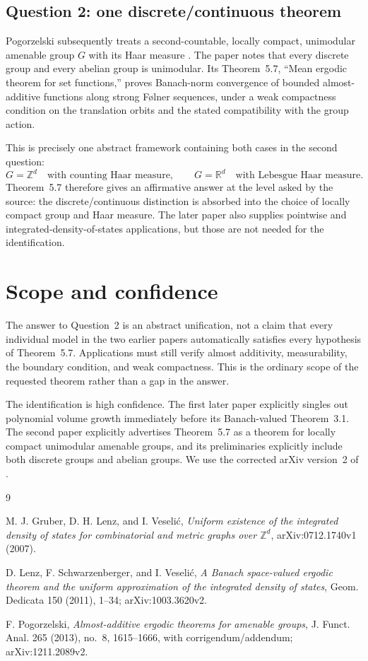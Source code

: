 \documentclass[11pt]{article}
\begin{document}
\subsection*{Question 2: one discrete/continuous theorem}

Pogorzelski subsequently treats a second-countable, locally compact,
unimodular amenable group $G$ with its Haar measure \cite{Pog}.  The paper
notes that every discrete group and every abelian group is unimodular.
Its Theorem~5.7, ``Mean ergodic theorem for set functions,'' proves
Banach-norm convergence of bounded almost-additive functions along strong
F\o lner sequences, under a weak compactness condition on the translation
orbits and the stated compatibility with the group action.

This is precisely one abstract framework containing both cases in the second
question:
\[
 G=\mathbb Z^d \quad\text{with counting Haar measure},
 \qquad
 G=\mathbb R^d \quad\text{with Lebesgue Haar measure}.
\]
Theorem~5.7 therefore gives an affirmative answer at the level asked by the
source: the discrete/continuous distinction is absorbed into the choice of
locally compact group and Haar measure.  The later paper also supplies
pointwise and integrated-density-of-states applications, but those are not
needed for the identification.

\section{Scope and confidence}

The answer to Question~2 is an abstract unification, not a claim that every
individual model in the two earlier papers automatically satisfies every
hypothesis of Theorem~5.7.  Applications must still verify almost additivity,
measurability, the boundary condition, and weak compactness.  This is the
ordinary scope of the requested theorem rather than a gap in the answer.

The identification is high confidence.  The first later paper explicitly
singles out polynomial volume growth immediately before its Banach-valued
Theorem~3.1.  The second paper explicitly advertises Theorem~5.7 as a theorem
for locally compact unimodular amenable groups, and its preliminaries explicitly
include both discrete groups and abelian groups.  We use the corrected arXiv
version~2 of \cite{Pog}.

\begin{thebibliography}{9}
\raggedright
{}
M. J. Gruber, D. H. Lenz, and I. Veseli\'c,
\emph{Uniform existence of the integrated density of states for combinatorial
and metric graphs over $\mathbb Z^d$}, arXiv:0712.1740v1 (2007).

D. Lenz, F. Schwarzenberger, and I. Veseli\'c,
\emph{A Banach space-valued ergodic theorem and the uniform approximation of
the integrated density of states}, Geom. Dedicata 150 (2011), 1--34;
arXiv:1003.3620v2.

F. Pogorzelski,
\emph{Almost-additive ergodic theorems for amenable groups},
J. Funct. Anal. 265 (2013), no.~8, 1615--1666, with corrigendum/addendum;
arXiv:1211.2089v2.
\end{thebibliography}
\end{document}
